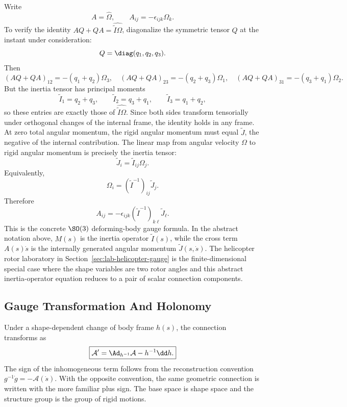 \begin{derivation}
Write
\[
  A=\widehat\Omega,\qquad A_{ij}=-\epsilon_{ijk}\Omega_k.
\]
To verify the identity \(AQ+QA=\widehat{\widetilde I\Omega}\), diagonalize the
symmetric tensor \(Q\) at the instant under consideration:
\[
  Q=\diag(q_1,q_2,q_3).
\]
Then
\[
  (AQ+QA)_{12}=-(q_1+q_2)\Omega_3,\quad
  (AQ+QA)_{23}=-(q_2+q_3)\Omega_1,\quad
  (AQ+QA)_{31}=-(q_3+q_1)\Omega_2.
\]
But the inertia tensor has principal moments
\[
  \widetilde I_1=q_2+q_3,\qquad
  \widetilde I_2=q_3+q_1,\qquad
  \widetilde I_3=q_1+q_2,
\]
so these entries are exactly those of
\(\widehat{\widetilde I\Omega}\). Since both sides transform tensorially under
orthogonal changes of the internal frame, the identity holds in any frame.
At zero total angular momentum, the rigid angular momentum must equal
\(\widetilde J\), the negative of the internal contribution. The linear map
from angular velocity \(\Omega\) to rigid angular momentum is precisely the
inertia tensor:
\[
  \widetilde J_i=\widetilde I_{ij}\Omega_j.
\]
Equivalently,
\[
  \Omega_i=(\widetilde I^{-1})_{ij}\widetilde J_j.
\]
Therefore
\[
  \boxed{
  A_{ij}
  =
  -\epsilon_{ijk}
  (\widetilde I^{-1})_{k\ell}\widetilde J_\ell.
  }
\]
This is the concrete \(\SO(3)\) deforming-body gauge formula. In the abstract
notation above, \(M(s)\) is the inertia operator
\(\widetilde I(s)\), while the cross term \(A(s)\dot s\) is the internally
generated angular momentum \(\widetilde J(s,\dot s)\). The helicopter rotor
laboratory in Section~\ref{sec:lab-helicopter-gauge} is the finite-dimensional
special case where the shape variables are two rotor angles and this abstract
inertia-operator equation reduces to a pair of scalar connection components.
\end{derivation}

\subsection{Gauge Transformation And Holonomy}
\label{subsec:gauge-holonomy}

Under a shape-dependent change of body frame \(h(s)\), the connection transforms
as
\[
  \boxed{
  \mathcal A'
  =
  \Ad_{h^{-1}}\mathcal A-h^{-1}\dd h.
  }
\]
The sign of the inhomogeneous term follows from the reconstruction convention
\(g^{-1}\dot g=-\mathcal A(\dot s)\). With the opposite convention, the same
geometric connection is written with the more familiar plus sign. The base space
is shape space and the structure group is the group of rigid motions.

